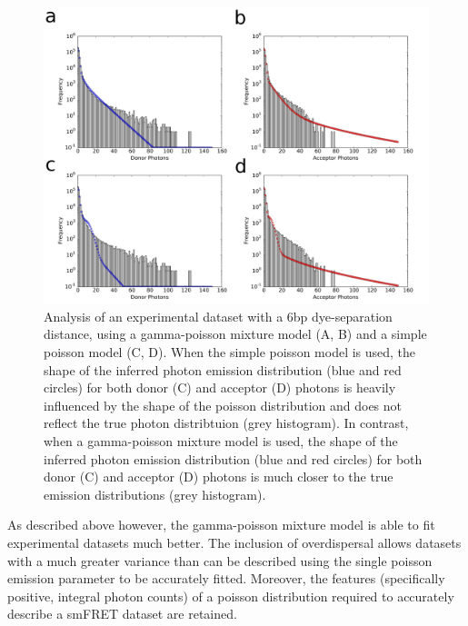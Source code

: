 \begin{figure}
   \begin{center}
      \includegraphics*[width=5in]{inference/poisson_vs_gp.pdf}
      \caption{Analysis of an experimental dataset with a 6bp dye-separation distance, using a gamma-poisson mixture model (A, B) and a simple poisson model (C, D). When the simple poisson model is used, the shape of the inferred photon emission distribution (blue and red circles) for both donor (C) and acceptor (D) photons is heavily influenced by the shape of the poisson distribution and does not reflect the true photon distribtuion (grey histogram). In contrast, when a gamma-poisson mixture model is used, the shape of the inferred photon emission distribution (blue and red circles) for both donor (C) and acceptor (D) photons is much closer to the true emission distributions (grey histogram).}
      \label{fig:super_poisson}
   \end{center}
\end{figure}

As described above however, the gamma-poisson mixture model is able to fit experimental datasets much better. The inclusion of overdispersal allows datasets with a much greater variance than can be described using the single poisson emission parameter to be accurately fitted. Moreover, the features (specifically positive, integral photon counts) of a poisson distribution required to accurately describe a smFRET dataset are retained.

